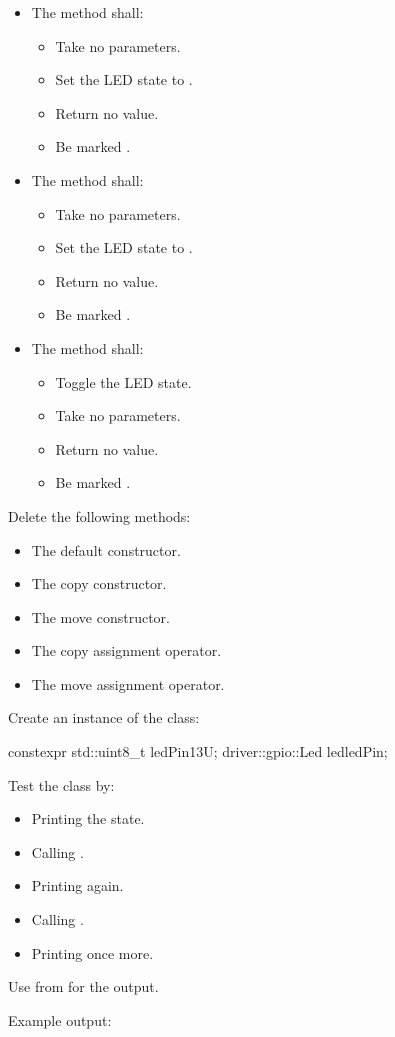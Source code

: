 \begin{parts}
\begin{itemize}
    \item The method  shall:
    \begin{itemize}
      \item Take no parameters.
      \item Set the LED state to .
      \item Return no value.
      \item Be marked .
    \end{itemize}
    \item The method  shall:
    \begin{itemize}
      \item Take no parameters.
      \item Set the LED state to .
      \item Return no value.
      \item Be marked .
    \end{itemize}
    \item The method  shall:
    \begin{itemize}
      \item Toggle the LED state.
      \item Take no parameters.
      \item Return no value.
      \item Be marked .
    \end{itemize}
  \end{itemize}
  \item Delete the following methods:
  \begin{itemize}
    \item The default constructor.
    \item The copy constructor.
    \item The move constructor.
    \item The copy assignment operator.
    \item The move assignment operator.
  \end{itemize}
  \item Create an instance of the class:
\begin{cppcode}
constexpr std::uint8_t ledPin{13U};
driver::gpio::Led led{ledPin};
\end{cppcode}
  Test the class by:
  \begin{itemize}
    \item Printing the state.
    \item Calling .
    \item Printing again.
    \item Calling .
    \item Printing once more.
  \end{itemize}
  Use  from  for the output.
\end{parts}
Example output:

